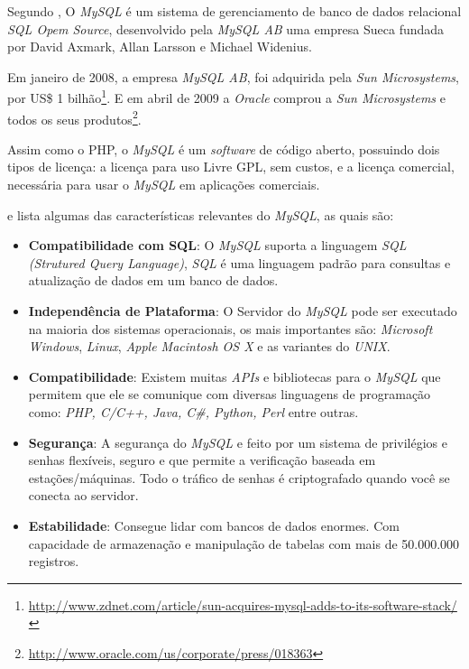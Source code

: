 Segundo , O \textit{MySQL} é um sistema de gerenciamento de banco de dados relacional \textit{SQL Opem Source}, desenvolvido pela \textit{MySQL AB} uma empresa Sueca fundada por David Axmark, Allan Larsson e Michael Widenius.

Em janeiro de 2008, a empresa \textit{MySQL AB}, foi adquirida pela \textit{Sun Microsystems}, por US\$ 1 bilhão\footnote{\url{http://www.zdnet.com/article/sun-acquires-mysql-adds-to-its-software-stack/}}. E em abril de 2009 a \textit{Oracle} comprou a \textit{Sun Microsystems} e todos os seus produtos\footnote{\url{http://www.oracle.com/us/corporate/press/018363}}.

Assim como o PHP, o \textit{MySQL} é um \textit{software} de código aberto, possuindo dois tipos de licença: a licença para uso Livre \ac{GPL}, sem custos, e a licença comercial, necessária para usar o \textit{MySQL} em aplicações comerciais.

 e  lista algumas das características relevantes do \textit{MySQL}, as quais são:
\begin{itemize}
    \item \textbf{Compatibilidade com SQL}: O \textit{MySQL} suporta a linguagem \textit{SQL (Strutured Query Language)}, \textit{SQL} é uma linguagem padrão para consultas e atualização de dados em um banco de dados.
    \item \textbf{Independência de Plataforma}: O Servidor do \textit{MySQL} pode ser executado na maioria dos sistemas operacionais, os mais importantes são: \textit{Microsoft Windows}, \textit{Linux}, \textit{Apple Macintosh OS X} e as variantes do \textit{UNIX}.
    \item \textbf{Compatibilidade}: Existem muitas \textit{APIs} e bibliotecas para o \textit{MySQL} que permitem que ele se comunique com diversas linguagens de programação como: \textit{PHP, C/C++, Java, C\#, Python, Perl} entre outras.
    \item \textbf{Segurança}: A segurança do \textit{MySQL} e feito por um sistema de privilégios e senhas flexíveis, seguro e que permite a verificação baseada em estações/máquinas. Todo o tráfico de senhas é criptografado quando você se conecta ao servidor.
    \item \textbf{Estabilidade}: Consegue lidar com bancos de dados enormes. Com capacidade de armazenação e manipulação de tabelas com mais de 50.000.000 registros.
\end{itemize}



